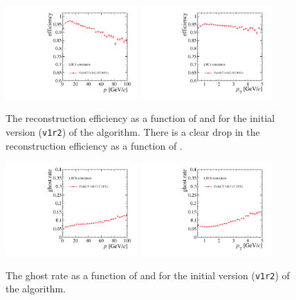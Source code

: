 \begin{figure}[!tb]
\centering
\includegraphics[width=0.45\textwidth]{figs/upstream-tracking-upgrade/eff_p_v1r2.pdf}
\includegraphics[width=0.45\textwidth]{figs/upstream-tracking-upgrade/eff_pt_v1r2.pdf}
\caption{The reconstruction efficiency as a function of \ptot and \pt for the initial version (\texttt{v1r2}) of the \velout algorithm. There is a clear drop in the reconstruction efficiency as a function of \ptot.}
\label{fig:eff_velout_v1r2}
\end{figure}

\begin{figure}[!tb]
\centering
\includegraphics[width=0.45\textwidth]{figs/upstream-tracking-upgrade/gr_p_v1r2.pdf}
\includegraphics[width=0.45\textwidth]{figs/upstream-tracking-upgrade/gr_pt_v1r2.pdf}
\caption{The ghost rate as a function of \ptot and \pt for the initial version (\texttt{v1r2}) of the \velout algorithm.}
\label{fig:gr_velout_v1r2}
\end{figure}

